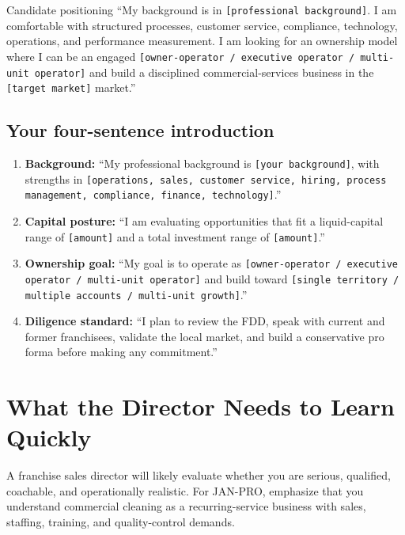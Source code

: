 \documentclass[11pt]{article}
\newcommand{\placeholder}[1]{\textcolor{accent}{\texttt{[#1]}}}
\newcommand{\janpro}{JAN-PRO}
\begin{document}
\begin{scriptbox}{Candidate positioning}
``My background is in \placeholder{professional background}. I am comfortable with structured processes, customer service, compliance, technology, operations, and performance measurement. I am looking for an ownership model where I can be an engaged \placeholder{owner-operator / executive operator / multi-unit operator} and build a disciplined commercial-services business in the \placeholder{target market} market.''
\end{scriptbox}

\subsection{Your four-sentence introduction}

\begin{enumerate}
  \item \textbf{Background:} ``My professional background is \placeholder{your background}, with strengths in \placeholder{operations, sales, customer service, hiring, process management, compliance, finance, technology}.''
  \item \textbf{Capital posture:} ``I am evaluating opportunities that fit a liquid-capital range of \placeholder{amount} and a total investment range of \placeholder{amount}.''
  \item \textbf{Ownership goal:} ``My goal is to operate as \placeholder{owner-operator / executive operator / multi-unit operator} and build toward \placeholder{single territory / multiple accounts / multi-unit growth}.''
  \item \textbf{Diligence standard:} ``I plan to review the FDD, speak with current and former franchisees, validate the local market, and build a conservative pro forma before making any commitment.''
\end{enumerate}

\section{What the Director Needs to Learn Quickly}

A franchise sales director will likely evaluate whether you are serious, qualified, coachable, and operationally realistic. For \janpro{}, emphasize that you understand commercial cleaning as a recurring-service business with sales, staffing, training, and quality-control demands.
\end{document}
